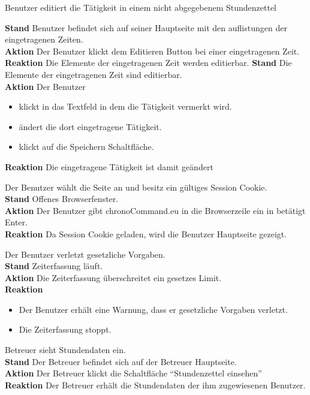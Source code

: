 \begin{requirements}
	 Benutzer editiert die Tätigkeit in einem nicht abgegebenem Stundenzettel
	\begin{requirements}
	        \textbf{Stand} Benutzer befindet sich auf seiner Hauptseite mit den auflistungen der eingetragenen Zeiten. \\
	        \textbf{Aktion} Der Benutzer klickt dem Editieren Button bei einer eingetragenen Zeit.\\
            \textbf{Reaktion} Die Elemente der eingetragenen Zeit werden editierbar.
        \textbf{Stand} Die Elemente der eingetragenen Zeit sind editierbar. \\
        \textbf{Aktion} Der Benutzer
            \begin{itemize}
                \item klickt in das Textfeld in dem die Tätigkeit vermerkt wird.
                \item ändert die dort eingetragene Tätigkeit.
                \item klickt auf die Speichern Schaltfläche.
            \end{itemize}
            \textbf{Reaktion} Die eingetragene Tätigkeit ist damit geändert
    \end{requirements}

     Der Benutzer wählt die Seite an und besitz ein gültiges Session Cookie. \\
        \textbf{Stand} Offenes Browserfenster. \\
        \textbf{Aktion} Der Benutzer gibt chronoCommand.eu in die Browserzeile ein in betätigt Enter. \\
        \textbf{Reaktion} Da Session Cookie geladen, wird die Benutzer Hauptseite gezeigt.

     Der Benutzer verletzt gesetzliche Vorgaben. \\
        \textbf{Stand} Zeiterfassung läuft. \\
        \textbf{Aktion} Die Zeiterfassung überschreitet ein gesetzes Limit. \\
        \textbf{Reaktion}
            \begin{itemize}
                \item Der Benutzer erhält eine Warnung, dass er gesetzliche Vorgaben verletzt.
                \item Die Zeiterfassung stoppt.
            \end{itemize}

     Betreuer sieht Stundendaten ein. \\
        \textbf{Stand} Der Betreuer befindet sich auf der Betreuer Hauptseite. \\
        \textbf{Aktion} Der Betreuer klickt die Schaltfläche "`Stundenzettel einsehen"' \\
        \textbf{Reaktion} Der Betreuer erhält die Stundendaten der ihm zugewiesenen Benutzer.

\end{requirements}
